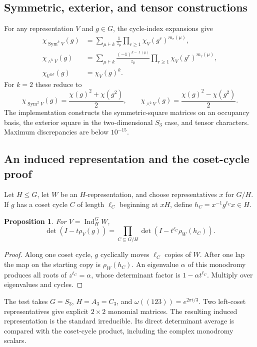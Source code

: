 \documentclass[10pt]{article}
\newcommand{\Sym}{\operatorname{Sym}}
\newtheorem{proposition}{Proposition}
\begin{document}
\subsection{Symmetric, exterior, and tensor constructions}
For any representation $V$ and $g\in G$, the cycle-index expansions give
\begin{align*}
 \chi_{\Sym^kV}(g)
 &=\sum_{\mu\vdash k}\frac1{z_\mu}
   \prod_{r\geq1}\chi_V(g^r)^{m_r(\mu)},\\
 \chi_{\wedge^kV}(g)
 &=\sum_{\mu\vdash k}\frac{(-1)^{k-\ell(\mu)}}{z_\mu}
   \prod_{r\geq1}\chi_V(g^r)^{m_r(\mu)},\\
 \chi_{V^{\otimes k}}(g)&=\chi_V(g)^k.
\end{align*}
For $k=2$ these reduce to
\[
 \chi_{\Sym^2V}(g)=\frac{\chi(g)^2+\chi(g^2)}2,
 \qquad
 \chi_{\wedge^2V}(g)=\frac{\chi(g)^2-\chi(g^2)}2.
\]
The implementation constructs the symmetric-square matrices on an occupancy
basis, the exterior square in the two-dimensional $S_3$ case, and tensor
characters.  Maximum discrepancies are below $10^{-15}$.

\subsection{An induced representation and the coset-cycle proof}
Let $H\leq G$, let $W$ be an $H$-representation, and choose representatives
$x$ for $G/H$.  If $g$ has a coset cycle $C$ of length $\ell_C$ beginning at
$xH$, define $h_C=x^{-1}g^{\ell_C}x\in H$.

\begin{proposition}
For $V=\operatorname{Ind}_H^GW$,
\[
 \det(I-t\rho_V(g))=
 \prod_{C\subseteq G/H}\det(I-t^{\ell_C}\rho_W(h_C)).
\]
\end{proposition}

\begin{proof}
Along one coset cycle, $g$ cyclically moves $\ell_C$ copies of $W$.  After one
lap the map on the starting copy is $\rho_W(h_C)$.  An eigenvalue $\alpha$ of
this monodromy produces all roots of $z^{\ell_C}=\alpha$, whose determinant
factor is $1-\alpha t^{\ell_C}$.  Multiply over eigenvalues and cycles.
\end{proof}

The test takes $G=S_3$, $H=A_3=C_3$, and
$\omega((123))=e^{2\pi i/3}$.  Two left-coset representatives give explicit
$2\times2$ monomial matrices.  The resulting induced representation is the
standard irreducible.  Its direct determinant average is compared with the
coset-cycle product, including the complex monodromy scalars.
\end{document}
